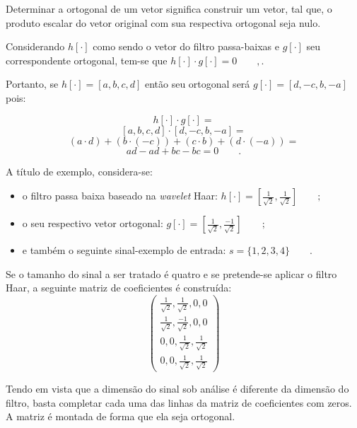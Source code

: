 			\par Determinar a ortogonal de um vetor significa construir um vetor, tal que, o produto escalar do vetor original com sua respectiva ortogonal seja nulo.
			
			\par Considerando $h[\cdot]$ como sendo o vetor do filtro passa-baixas e $g[\cdot]$ seu correspondente ortogonal, tem-se que $h[\cdot] \cdot g[\cdot] = 0\qquad,$.
			\par Portanto, se $h[\cdot]=[a, b, c, d]$ então seu ortogonal será $g[\cdot]=[d, -c, b, -a]$ pois:
			
			$$
				h[\cdot] \cdot g[\cdot]  =
			$$
			$$
			    [a, b, c, d] \cdot [d, -c, b, -a] = 
			$$
			$$
				(a \cdot d) + (b \cdot (-c)) + (c \cdot b) + (d \cdot (-a)) = 
			$$
			$$
				ad - ad + bc - bc = 0 \qquad.
			$$

			\par A título de exemplo, considera-se:
			\begin{itemize}
				\item o filtro passa baixa baseado na \textit{wavelet} Haar: $h[\cdot] = [\frac{1}{\sqrt{2}}, \frac{1}{\sqrt{2}}]\qquad;$
				\item o seu respectivo vetor ortogonal: $g[\cdot] = [\frac{1}{\sqrt{2}}, \frac{-1}{\sqrt{2}}]\qquad;$
				\item e também o seguinte sinal-exemplo de entrada: $s = \{1,2,3,4\}\qquad.$
			\end{itemize}

			\par Se o tamanho do sinal a ser tratado é quatro e se pretende-se aplicar o filtro Haar, a seguinte matriz de coeficientes é construída:
			\begin{equation}
				\begin{pmatrix}
					\frac{1}{\sqrt{2}}, \frac{1}{\sqrt{2}}, 0, 0\\
					\frac{1}{\sqrt{2}}, \frac{-1}{\sqrt{2}}, 0, 0\\
					0, 0, \frac{1}{\sqrt{2}}, \frac{1}{\sqrt{2}}\\
					0, 0, \frac{1}{\sqrt{2}}, \frac{1}{\sqrt{2}}
					\label{eq:haarFilters}
				\end{pmatrix} 
			\end{equation}
			\par Tendo em vista que a dimensão do sinal sob análise é diferente da dimensão do filtro, basta completar cada uma das linhas da matriz de coeficientes com zeros. A matriz é montada de forma que ela seja ortogonal.

